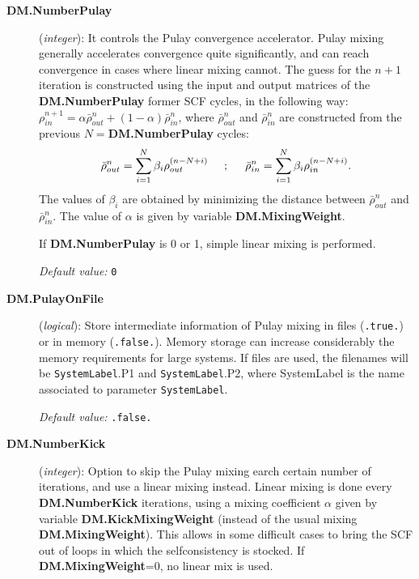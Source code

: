 \begin{description}
\item[{\bf DM.NumberPulay}] ({\it integer}): 
It controls the Pulay convergence accelerator. Pulay mixing generally
accelerates convergence quite significantly, and can
reach convergence in cases where linear mixing cannot.
The guess for the $n+1$ iteration is constructed using the
input and output matrices of the {\bf DM.NumberPulay} former
SCF cycles, in the following way:
$\rho^{n+1}_{in} = \alpha \bar{\rho}^{n}_{out} 
+(1 - \alpha) \bar{\rho}^{n}_{in}$, where $\bar{\rho}^{n}_{out}$
and $\bar{\rho}^{n}_{in}$ are constructed from the previous
$N=${\bf DM.NumberPulay} cycles:
%
\begin{equation}
\bar{\rho}^{n}_{out} = \sum_{i=1}^N
\beta_i \rho_{out}^{(n-N+i)} \hspace{0.5truecm}; \hspace{0.5truecm}
\bar{\rho}^{n}_{in} = \sum_{i=1}^N
\beta_i \rho_{in}^{(n-N+i)}.
\nonumber
\end{equation}
%
The values of $\beta_i$ are obtained by minimizing the distance
between $\bar{\rho}^{n}_{out}$ and $\bar{\rho}^{n}_{in}$.
The value of $\alpha$ is given by variable {\bf DM.MixingWeight}.

If {\bf DM.NumberPulay} is 0 or 1, simple linear mixing is
performed.

{\it Default value:} {\tt 0}

\item[{\bf DM.PulayOnFile}] ({\it logical}): 
Store intermediate information of Pulay mixing in files
({\tt .true.}) or in memory ({\tt .false.}).
Memory storage can increase considerably the
memory requirements for large systems.
If files are used, the filenames will be 
{\tt SystemLabel}.P1 and 
{\tt SystemLabel}.P2,
where SystemLabel is the name associated
to parameter {\tt SystemLabel}.

{\it Default value:} {\tt .false.}

\item[{\bf DM.NumberKick}] ({\it integer}): 
Option to skip the Pulay mixing earch certain number of iterations,
and use a linear mixing instead. Linear mixing is done
every {\bf DM.NumberKick} iterations, using a mixing coefficient
$\alpha$ given by variable {\bf DM.KickMixingWeight} 
(instead of the usual mixing {\bf DM.MixingWeight}).
This allows in some difficult cases to bring the SCF out of
loops in which the selfconsistency is stocked.
If {\bf DM.MixingWeight}=0, no linear mix is used.


\end{description}
